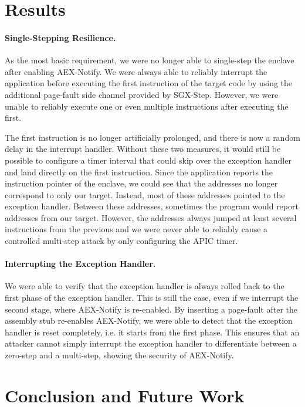 \documentclass{llncs}
\begin{document}
\section{Results}

\paragraph{Single-Stepping Resilience.}
As the most basic requirement,
we were no longer able to single-step the enclave after enabling AEX-Notify.
We were always able to reliably interrupt the application
before executing the first instruction of the target code
by using the additional page-fault side channel provided by SGX-Step.
However, we were unable to reliably execute one or
even multiple instructions after executing the first.

The first instruction is no longer artificially prolonged, and there is now a random delay in the interrupt handler. Without these two measures, it would still be possible to configure a timer interval that could skip over the exception handler and land directly on the first instruction.
Since the application reports the instruction pointer of the enclave,
we could see that the addresses no longer correspond to only our target.
Instead, most of these addresses pointed to the exception handler.
Between these addresses, sometimes the program would report addresses from our target.
However, the addresses always jumped at least several instructions from the previous
and we were never able to reliably cause a controlled multi-step attack
by only configuring the APIC timer.

\paragraph{Interrupting the Exception Handler.}
We were able to verify that the exception handler is always rolled back to the first phase of the exception handler.
This is still the case, even if we interrupt the second stage, where AEX-Notify is re-enabled.
By inserting a page-fault after the assembly stub re-enables AEX-Notify,
we were able to detect that the exception handler is reset completely,
i.e. it starts from the first phase.
This ensures that an attacker cannot simply interrupt the exception handler
to differentiate between a zero-step and a multi-step,
showing the security of AEX-Notify.

\section{Conclusion and Future Work}
\end{document}
